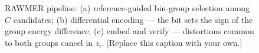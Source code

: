 
\begin{figure}[t]
\centering
\setlength{\fboxsep}{0pt}
\setlength{\fboxrule}{0.4pt}
\caption{RAWMER pipeline: (a) reference-guided bin-group selection among $C$
candidates; (b) differential encoding — the bit sets the sign of the group energy
difference; (c) embed and verify — distortions common to both groups cancel in
$z_i$. [Replace this caption with your own.]}
\label{fig:method}
\end{figure}
